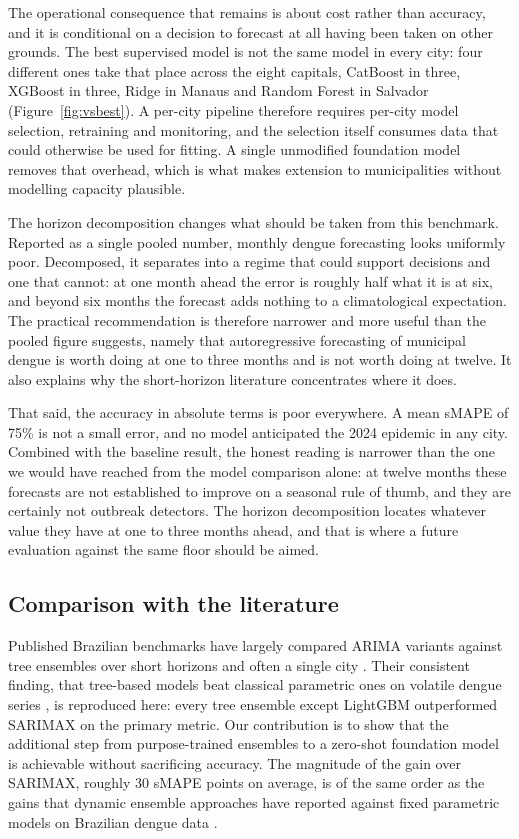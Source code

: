 \documentclass[11pt]{article}
\begin{document}
The operational consequence that remains is about cost rather than accuracy, and it is
conditional on a decision to forecast at all having been taken on other grounds. The best
supervised model
is not the same model in every city: four different ones take that place across the eight
capitals, CatBoost in three, XGBoost in three, Ridge in Manaus and Random Forest in
Salvador (Figure~\ref{fig:vsbest}). A per-city pipeline therefore requires per-city model
selection, retraining and monitoring, and the selection itself consumes data that could
otherwise be used for fitting. A single unmodified foundation model removes that
overhead, which is what makes extension to municipalities without modelling capacity
plausible.

The horizon decomposition changes what should be taken from this benchmark. Reported as a
single pooled number, monthly dengue forecasting looks uniformly poor. Decomposed, it
separates into a regime that could support decisions and one that cannot: at one month
ahead the error is roughly half what it is at six, and beyond six months the forecast adds
nothing to a climatological expectation. The practical recommendation is therefore
narrower and more useful than the pooled figure suggests, namely that autoregressive
forecasting of municipal dengue is worth doing at one to three months and is not worth
doing at twelve. It also explains why the short-horizon literature
\citep{Silva2026capitals,Araujo2026sprint} concentrates where it does.

That said, the accuracy in absolute terms is poor everywhere. A mean sMAPE of 75\% is not
a small error, and no model anticipated the 2024 epidemic in any city. Combined with the
baseline result, the honest reading is narrower than the one we would have reached from the
model comparison alone: at twelve months these forecasts are not established to improve on
a seasonal rule of thumb, and they are certainly not outbreak detectors. The horizon
decomposition locates whatever value they have at one to three months ahead, and that is
where a future evaluation against the same floor should be aimed.

\subsection{Comparison with the literature}

Published Brazilian benchmarks have largely compared ARIMA variants against tree ensembles
over short horizons and often a single city
\citep{Roster2022,Chen2025rj,Sebastianelli2024}. Their consistent finding, that
tree-based models beat classical parametric ones on volatile dengue series
\citep{Fang2024}, is reproduced here: every tree ensemble except LightGBM outperformed
SARIMAX on the primary metric. Our contribution is to show that the additional step from
purpose-trained ensembles to a zero-shot foundation model is achievable without
sacrificing accuracy. The magnitude of the gain over SARIMAX, roughly 30 sMAPE points on
average, is of the same order as the gains that dynamic ensemble approaches have reported
against fixed parametric models on Brazilian dengue data \citep{McGough2021}.
\end{document}
